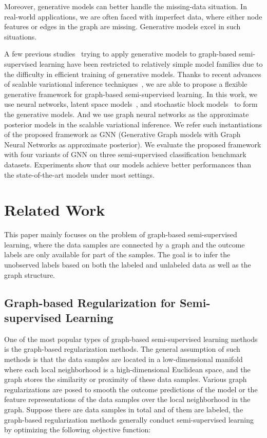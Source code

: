 \documentclass{article}
\begin{document}
Moreover, generative models can better handle the missing-data situation. In real-world applications, we are often faced with imperfect data, where either node features or edges in the graph are missing. Generative models excel in such situations.

A few previous studies~\cite{zhang2018bayesian} trying to apply generative models to graph-based semi-supervised learning have been restricted to relatively simple model families due to the difficulty in efficient training of generative models. Thanks to recent advances of scalable variational inference techniques~\cite{kingma2013auto,kingma2014semi}, we are able to propose a flexible generative framework for graph-based semi-supervised learning. In this work, we use neural networks, latent space models~\cite{hoff2002latent}, and stochastic block models~\cite{holland1983stochastic} to form the generative models. And we use graph neural networks as the approximate posterior models in the scalable variational inference. We refer such instantiations of the proposed framework as GNN (Generative Graph models with Graph Neural Networks as approximate posterior). We evaluate the proposed framework with four variants of GNN on three semi-supervised classification benchmark datasets. Experiments show that our models achieve better performances than the state-of-the-art models under most settings. 

 \section{Related Work}
\label{sec:related}
This paper mainly focuses on the problem of graph-based semi-supervised learning, where the data samples are connected by a graph and the outcome labels are only available for part of the samples. The goal is to infer the unobserved labels based on both the labeled and unlabeled data as well as the graph structure.

\subsection{Graph-based Regularization for Semi-supervised Learning}
One of the most popular types of graph-based semi-supervised learning methods is the graph-based regularization methods. The general assumption of such methods is that the data samples are located in a low-dimensional manifold where each local neighborhood is a high-dimensional Euclidean space, and the graph stores the similarity or proximity of these data samples. Various graph regularizations are posed to smooth the outcome predictions of the model or the feature representations of the data samples over the local neighborhood in the graph. Suppose there are  data samples in total and  of them are labeled, the graph-based regularization methods generally conduct semi-supervised learning by optimizing the following objective function:
\end{document}
